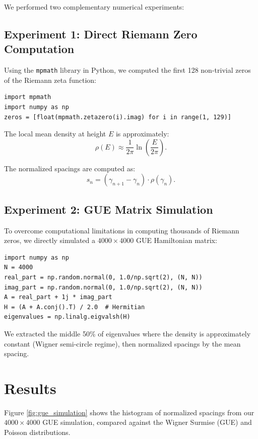\documentclass[12pt,a4paper]{article}
\begin{document}
We performed two complementary numerical experiments:

\subsection{Experiment 1: Direct Riemann Zero Computation}

Using the \texttt{mpmath} library in Python, we computed the first 128 non-trivial zeros of the Riemann zeta function:
\begin{verbatim}
import mpmath
import numpy as np
zeros = [float(mpmath.zetazero(i).imag) for i in range(1, 129)]
\end{verbatim}

The local mean density at height $E$ is approximately:
\begin{equation}
\rho(E) \approx \frac{1}{2\pi} \ln\left(\frac{E}{2\pi}\right).
\end{equation}

The normalized spacings are computed as:
\begin{equation}
s_n = (\gamma_{n+1} - \gamma_n) \cdot \rho(\gamma_n).
\end{equation}

\subsection{Experiment 2: GUE Matrix Simulation}

To overcome computational limitations in computing thousands of Riemann zeros, we directly simulated a $4000 \times 4000$ GUE Hamiltonian matrix:

\begin{verbatim}
import numpy as np
N = 4000
real_part = np.random.normal(0, 1.0/np.sqrt(2), (N, N))
imag_part = np.random.normal(0, 1.0/np.sqrt(2), (N, N))
A = real_part + 1j * imag_part
H = (A + A.conj().T) / 2.0  # Hermitian
eigenvalues = np.linalg.eigvalsh(H)
\end{verbatim}

We extracted the middle 50\% of eigenvalues where the density is approximately constant (Wigner semi-circle regime), then normalized spacings by the mean spacing.

\section{Results}

Figure \ref{fig:gue_simulation} shows the histogram of normalized spacings from our $4000 \times 4000$ GUE simulation, compared against the Wigner Surmise (GUE) and Poisson distributions.
\end{document}
